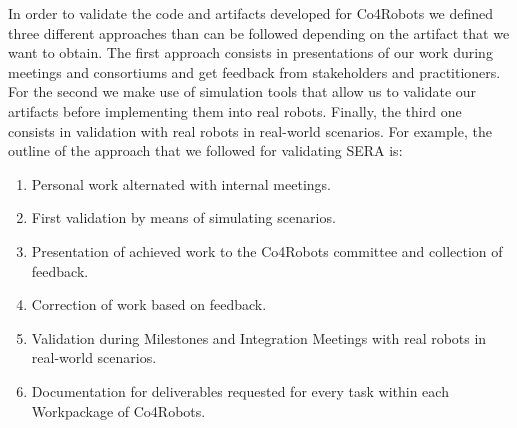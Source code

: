
In order to validate the code and artifacts developed for Co4Robots we defined three different approaches than can be followed depending on the artifact that we want to obtain.
The first approach consists in presentations of our work during meetings and consortiums and get feedback from stakeholders and practitioners.
For the second we make use of simulation tools that allow us to validate our artifacts before implementing them into real robots.
Finally, the third one consists in validation with real robots in real-world scenarios.
For example, the outline of the approach that we followed for validating SERA is:
\begin{enumerate}
\item Personal work alternated with internal meetings.
\item First validation by means of simulating scenarios.
\item Presentation of achieved work to the Co4Robots committee and collection of feedback.
\item Correction of work based on feedback.
\item Validation during Milestones and Integration Meetings with real robots in real-world scenarios.
\item Documentation for deliverables requested for every task within each Workpackage of Co4Robots.
\end{enumerate}



